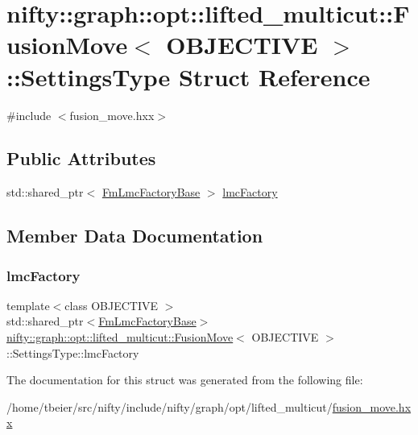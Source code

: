 \hypertarget{structnifty_1_1graph_1_1opt_1_1lifted__multicut_1_1FusionMove_1_1SettingsType}{}\section{nifty\+:\+:graph\+:\+:opt\+:\+:lifted\+\_\+multicut\+:\+:Fusion\+Move$<$ O\+B\+J\+E\+C\+T\+I\+VE $>$\+:\+:Settings\+Type Struct Reference}
\label{structnifty_1_1graph_1_1opt_1_1lifted__multicut_1_1FusionMove_1_1SettingsType}


{\ttfamily \#include $<$fusion\+\_\+move.\+hxx$>$}

\subsection*{Public Attributes}
\begin{DoxyCompactItemize}
\item 
std\+::shared\+\_\+ptr$<$ \hyperlink{classnifty_1_1graph_1_1opt_1_1lifted__multicut_1_1FusionMove_a94c363de011091cabdac7cc44908e63a}{Fm\+Lmc\+Factory\+Base} $>$ \hyperlink{structnifty_1_1graph_1_1opt_1_1lifted__multicut_1_1FusionMove_1_1SettingsType_aa8651850be118b520f66f3c59fda410c}{lmc\+Factory}
\end{DoxyCompactItemize}


\subsection{Member Data Documentation}
\mbox{\label{structnifty_1_1graph_1_1opt_1_1lifted__multicut_1_1FusionMove_1_1SettingsType_aa8651850be118b520f66f3c59fda410c}} 
\subsubsection{\texorpdfstring{lmc\+Factory}{lmcFactory}}
{\footnotesize\ttfamily template$<$class O\+B\+J\+E\+C\+T\+I\+VE $>$ \\
std\+::shared\+\_\+ptr$<$\hyperlink{classnifty_1_1graph_1_1opt_1_1lifted__multicut_1_1FusionMove_a94c363de011091cabdac7cc44908e63a}{Fm\+Lmc\+Factory\+Base}$>$ \hyperlink{classnifty_1_1graph_1_1opt_1_1lifted__multicut_1_1FusionMove}{nifty\+::graph\+::opt\+::lifted\+\_\+multicut\+::\+Fusion\+Move}$<$ O\+B\+J\+E\+C\+T\+I\+VE $>$\+::Settings\+Type\+::lmc\+Factory}



The documentation for this struct was generated from the following file\+:\begin{DoxyCompactItemize}
\item 
/home/tbeier/src/nifty/include/nifty/graph/opt/lifted\+\_\+multicut/\hyperlink{lifted__multicut_2fusion__move_8hxx}{fusion\+\_\+move.\+hxx}\end{DoxyCompactItemize}
